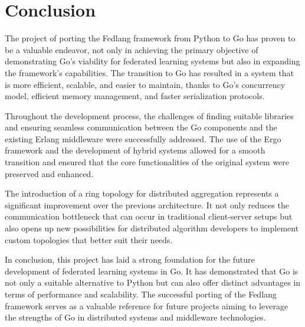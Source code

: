 \chapter{Conclusion}
The project of porting the Fedlang framework from Python to Go has proven to be a valuable endeavor, not only in achieving the primary objective of demonstrating Go's viability for federated learning systems but also in expanding the framework's capabilities. The transition to Go has resulted in a system that is more efficient, scalable, and easier to maintain, thanks to Go's concurrency model, efficient memory management, and faster serialization protocols.

Throughout the development process, the challenges of finding suitable libraries and ensuring seamless communication between the Go components and the existing Erlang middleware were successfully addressed. The use of the Ergo framework and the development of hybrid systems allowed for a smooth transition and ensured that the core functionalities of the original system were preserved and enhanced.

The introduction of a ring topology for distributed aggregation represents a significant improvement over the previous architecture. It not only reduces the communication bottleneck that can occur in traditional client-server setups but also opens up new possibilities for distributed algorithm developers to implement custom topologies that better suit their needs.

In conclusion, this project has laid a strong foundation for the future development of federated learning systems in Go. It has demonstrated that Go is not only a suitable alternative to Python but can also offer distinct advantages in terms of performance and scalability. The successful porting of the Fedlang framework serves as a valuable reference for future projects aiming to leverage the strengths of Go in distributed systems and middleware technologies.


